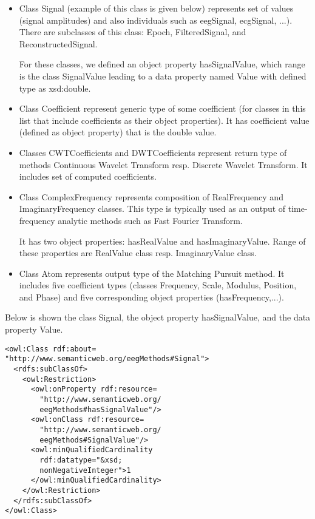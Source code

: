 \documentclass[a4paper,twoside]{article}
\begin{document}
\begin{itemize}
\item Class Signal (example of this class is given below) represents set of values (signal amplitudes) and also individuals such as eegSignal, ecgSignal, ...). There are subclasses of this class: Epoch, FilteredSignal, and ReconstructedSignal.

For these classes, we defined an object property hasSignalValue, which range is the class SignalValue leading to a data property named Value with defined type as xsd:double.

\item Class Coefficient represent generic type of some coefficient (for classes in this list that include coefficients as their object properties). It has coefficient value (defined as object property) that is the double value.
  
\item Classes CWTCoefficients and DWTCoefficients represent return type of methods Continuous Wavelet Transform resp. Discrete Wavelet Transform. It includes set of computed coefficients.

\item Class ComplexFrequency represents composition of RealFrequency and ImaginaryFrequency classes. This type is typically used as an output of time-frequency analytic methods such as Fast Fourier Transform. 

It has two object properties: hasRealValue and hasImaginaryValue. Range of these properties are RealValue class resp. ImaginaryValue class. 

\item Class Atom represents output type of the Matching Pursuit method. It includes five coefficient types (classes Frequency, Scale, Modulus, Position, and Phase) and five corresponding object properties (hasFrequency,...).
\end{itemize}

Below is shown the class Signal, the object property hasSignalValue, and the data property Value.

\begin{small}
\begin{verbatim}
<owl:Class rdf:about=
"http://www.semanticweb.org/eegMethods#Signal">
  <rdfs:subClassOf>
    <owl:Restriction>
      <owl:onProperty rdf:resource=
        "http://www.semanticweb.org/
        eegMethods#hasSignalValue"/>
      <owl:onClass rdf:resource=
        "http://www.semanticweb.org/
        eegMethods#SignalValue"/>
      <owl:minQualifiedCardinality
        rdf:datatype="&xsd;
        nonNegativeInteger">1
      </owl:minQualifiedCardinality>
    </owl:Restriction>
  </rdfs:subClassOf>
</owl:Class>
\end{verbatim}
\end{small}
\end{document}
